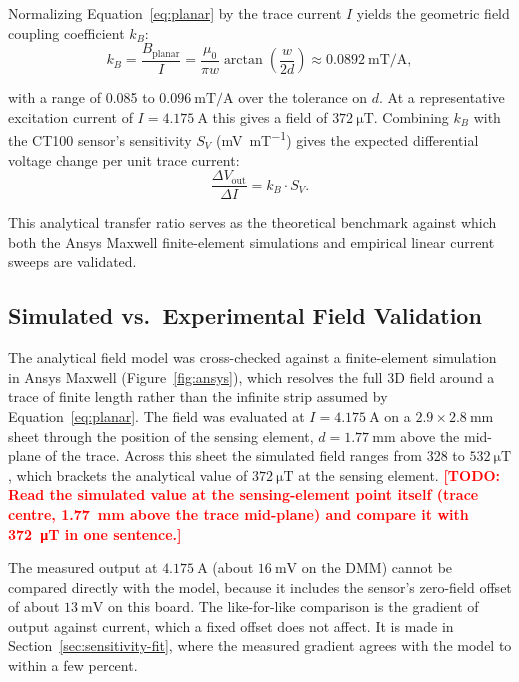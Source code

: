 \documentclass[12pt,a4paper]{article}
\newcommand{\todo}[1]{\textcolor{red}{\textbf{[TODO: #1]}}}
\begin{document}
Normalizing Equation~\eqref{eq:planar} by the trace current $I$ yields the geometric field coupling coefficient $k_B$:
\begin{equation}
k_B = \frac{B_{\text{planar}}}{I} = \frac{\mu_0}{\pi w} \arctan\left( \frac{w}{2d} \right) \approx \SI{0.0892}{\milli\tesla\per\ampere},
\label{eq:field-coeff}
\end{equation}

with a range of 0.085 to $\SI{0.096}{\milli\tesla\per\ampere}$ over the tolerance on $d$. At a representative excitation current of $I = \SI{4.175}{\ampere}$ this gives a field of $\SI{372}{\micro\tesla}$. Combining $k_B$ with the CT100 sensor's sensitivity $S_V$ (\si{\milli\volt\per\milli\tesla}) gives the expected differential voltage change per unit trace current:
\begin{equation}
\frac{\Delta V_{\text{out}}}{\Delta I} = k_B \cdot S_V.
\label{eq:sensitivity-transfer}
\end{equation}

This analytical transfer ratio serves as the theoretical benchmark against which both the Ansys Maxwell finite-element simulations and empirical linear current sweeps are validated.

\subsection{Simulated vs.\ Experimental Field Validation}
\label{sec:field-validation}

The analytical field model was cross-checked against a finite-element simulation in Ansys Maxwell (Figure~\ref{fig:ansys}), which resolves the full 3D field around a trace of finite length rather than the infinite strip assumed by Equation~\eqref{eq:planar}. The field was evaluated at $I = \SI{4.175}{\ampere}$ on a $2.9 \times \SI{2.8}{\milli\metre}$ sheet through the position of the sensing element, $d = \SI{1.77}{\milli\metre}$ above the mid-plane of the trace. Across this sheet the simulated field ranges from 328 to $\SI{532}{\micro\tesla}$, which brackets the analytical value of $\SI{372}{\micro\tesla}$ at the sensing element. \todo{Read the simulated value at the sensing-element point itself (trace centre, \SI{1.77}{\milli\metre} above the trace mid-plane) and compare it with \SI{372}{\micro\tesla} in one sentence.}

The measured output at $\SI{4.175}{\ampere}$ (about $\SI{16}{\milli\volt}$ on the DMM) cannot be compared directly with the model, because it includes the sensor's zero-field offset of about $\SI{13}{\milli\volt}$ on this board. The like-for-like comparison is the gradient of output against current, which a fixed offset does not affect. It is made in Section~\ref{sec:sensitivity-fit}, where the measured gradient agrees with the model to within a few percent.
\end{document}
